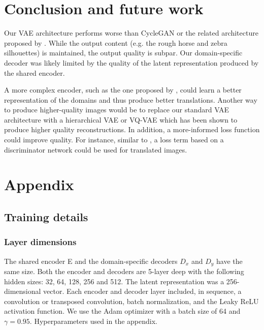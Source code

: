 \documentclass{article}
\begin{document}

\section{Conclusion and future work}
Our VAE architecture performs worse than CycleGAN or the related architecture proposed by \citet{liu}. While the output content (e.g. the rough horse and zebra silhouettes) is maintained, the output quality is subpar. Our domain-specific decoder was likely limited by the quality of the latent representation produced by the shared encoder.

A more complex encoder, such as the one proposed by \citet{liu}, could learn a better representation of the domains and thus produce better translations. Another way to produce higher-quality images would be to replace our standard VAE architecture with a hierarchical VAE or VQ-VAE which has been shown to produce higher quality reconstructions. In addition, a more-informed loss function could improve quality. For instance, similar to \citet{liu}, a loss term based on a discriminator network could be used for translated images.

\newpage


\newpage
\appendix
\section*{Appendix}
\renewcommand{\thesubsection}{\Alph{subsection}}
\subsection{Training details}
\subsubsection{Layer dimensions}
The shared encoder E and the domain-specific decoders $D_x$ and $D_y$ have the same size. Both the encoder and decoders are 5-layer deep with the following hidden sizes: 32, 64, 128, 256 and 512. The latent representation was a 256-dimensional vector. Each encoder and decoder layer included, in sequence, a convolution or transposed convolution, batch normalization, and the Leaky ReLU activation function. We use the Adam optimizer with a batch size of 64 and $\gamma = 0.95$. Hyperparameters used in the appendix.
\end{document}

